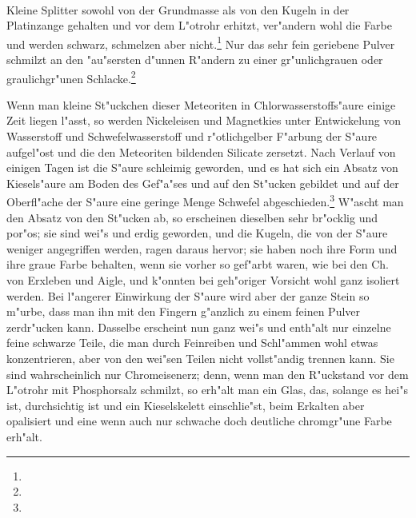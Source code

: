 \documentclass[a4paper, 11pt, oneside]{article}
\begin{document}
\paragraph{}
Kleine Splitter sowohl von der Grundmasse als von den Kugeln in der Platinzange gehalten und vor dem L"otrohr erhitzt, ver"andern wohl die Farbe und werden schwarz, schmelzen aber nicht.\footnote{} Nur das sehr fein geriebene Pulver schmilzt an den "au"sersten d"unnen R"andern zu einer gr"unlichgrauen oder graulichgr"unen Schlacke.\footnote{}

Wenn man kleine St"uckchen dieser Meteoriten in Chlorwasserstoffs"aure einige Zeit liegen l"asst, so werden Nickeleisen und Magnetkies unter Entwickelung von Wasserstoff und Schwefelwasserstoff und r"otlichgelber F"arbung der S"aure aufgel"ost und die den Meteoriten bildenden Silicate zersetzt. Nach Verlauf von einigen Tagen ist die S"aure schleimig geworden, und es hat sich ein Absatz von Kiesels"aure am Boden des Gef"a"ses und auf den St"ucken gebildet und auf der Oberfl"ache der S"aure eine geringe Menge Schwefel abgeschieden.\footnote{} W"ascht man den Absatz von den St"ucken ab, so erscheinen dieselben sehr br"ocklig und por"os; sie sind wei"s und erdig geworden, und die Kugeln, die von der S"aure weniger angegriffen werden, ragen daraus hervor; sie haben noch ihre Form und ihre graue Farbe behalten, wenn sie vorher so gef"arbt waren, wie bei den Ch. von Erxleben und Aigle, und k"onnten bei geh"origer Vorsicht wohl ganz isoliert werden. Bei l"angerer Einwirkung der S"aure wird aber der ganze Stein so m"urbe, dass man ihn mit den Fingern g"anzlich zu einem feinen Pulver zerdr"ucken kann. Dasselbe erscheint nun ganz wei"s und enth"alt nur einzelne feine schwarze Teile, die man durch Feinreiben und Schl"ammen wohl etwas konzentrieren, aber von den wei"sen Teilen nicht vollst"andig trennen kann. Sie sind wahrscheinlich nur Chromeisenerz; denn, wenn man den R"uckstand vor dem L"otrohr mit Phosphorsalz schmilzt, so erh"alt man ein Glas, das, solange es hei"s ist, durchsichtig ist und ein Kieselskelett einschlie"st, beim Erkalten aber opalisiert und eine wenn auch nur schwache doch deutliche chromgr"une Farbe erh"alt.
\end{document}
